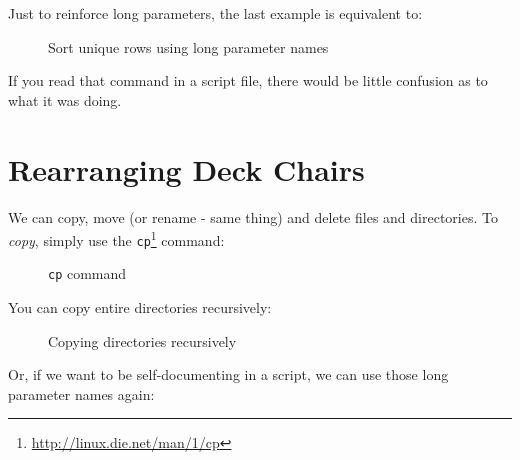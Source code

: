 \documentclass[10pt,american,]{book}
\makeatletter
\newenvironment{Shaded}{\begin{snugshade}}{\end{snugshade}}
\newcommand{\KeywordTok}[1]{\textcolor[rgb]{0.13,0.29,0.53}{\textbf{{#1}}}}
\newcommand{\NormalTok}[1]{{#1}}
\renewcommand{\href}[2]{#2\footnote{\url{#1}}}
\numberwithin{figure}{chapter}
\DeclareRobustCommand{\drcap}[1]{\begin{figure}[H]\caption{#1}\end{figure}}
\DeclareRobustCommand{\drcmd}[1]{\index{commands!#1@\texttt{#1}}}
\renewcommand{\KeywordTok}[1]{{#1}}
\renewcommand{\NormalTok}[1]{{#1}}
\makeatother
\begin{document}
Just to reinforce long parameters, the last example is equivalent to:

\drcap{Sort unique rows using long parameter names}

\begin{Shaded}
\end{Shaded}

If you read that command in a script file, there would be little
confusion as to what it was doing.

\section*{Rearranging Deck Chairs}\label{rearranging-deck-chairs}

We can copy, move (or rename - same thing) and delete files and
directories. To \emph{copy}, simply use the
\href{http://linux.die.net/man/1/cp}{\texttt{cp}}\drcmd{cp}
 command:

\drcap{\texttt{cp} command}

\begin{Shaded}
\end{Shaded}

You can copy entire directories recursively:

\drcap{Copying directories recursively}

\begin{Shaded}
\end{Shaded}

Or, if we want to be self-documenting in a script, we can use those long
parameter names again:
\end{document}
